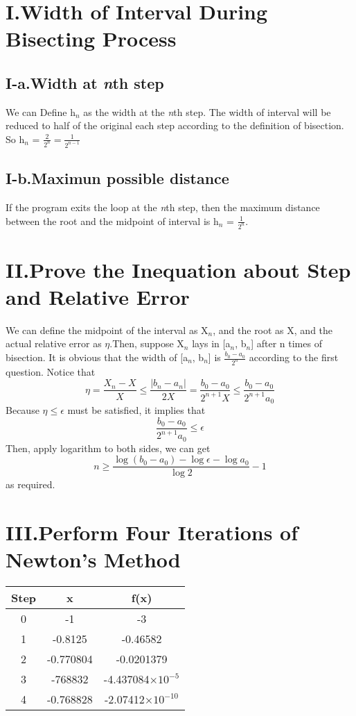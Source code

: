 \documentclass[twoside,a4paper,12pt]{article}
\begin{document}
\pagestyle{fancy}
\fancyhead{}

\section*{I.Width of Interval During Bisecting Process}

\subsection*{I-a.Width at \emph{n}th step} 
We can Define h$ _n$ as the width at the \emph{n}th step.
The width of interval will be reduced to half of the original each step according to the definition of bisection. So h$ _n$ = 
$\frac{2}{2^n}=\frac{1}{2^{n-1}}$

\subsection*{I-b.Maximun possible distance} 
If the program exits the loop at the \emph{n}th step, then the maximum distance between the root and the midpoint of interval is h$_n$ = 
$\frac{1}{2^n}$.
\section*{II.Prove the Inequation about Step and Relative Error}
We can define the midpoint of the interval as X$_n$, and the root as X, and the actual relative error as $\eta$.Then, suppose X$_n$ lays in [a$_n$, b$_n$] after n times of bisection. It is obvious that the width of [a$_n$, b$_n$] is $\frac{b_0-a_0}{2^n}$ according to the first question. Notice that 
\[
\eta = \frac{X_n-X}{X} \le \frac{|b_n-a_n|}{2X} = \frac{b_0-a_0}{2^{n+1}X} \le \frac{b_0-a_0}{2^{n+1}a_0}
\]
Because $\eta \le \epsilon$ must be satisfied, it implies that
\[
\frac{b_0-a_0}{2^{n+1}a_0} \le \epsilon
\] 
Then, apply logarithm to both sides, we can get 
\[
n \ge \frac{\log {(b_0-a_0)}-\log{\epsilon}-\log{a_0}}{\log {2}}-1
\]
as required.

\section*{III.Perform Four Iterations of Newton's Method}
\begin{tabular}{|c|c|c|}
\hline
Step & x & f(x)\\
\hline
0 & -1 & -3\\
\hline
1 & -0.8125 & -0.46582\\
\hline
2 & -0.770804 & -0.0201379\\
\hline
3 & -768832 & -4.437084$\times 10^{-5}$\\
\hline
4 & -0.768828 & -2.07412$\times 10^{-10}$\\
\hline
\end{tabular}
\end{document}

